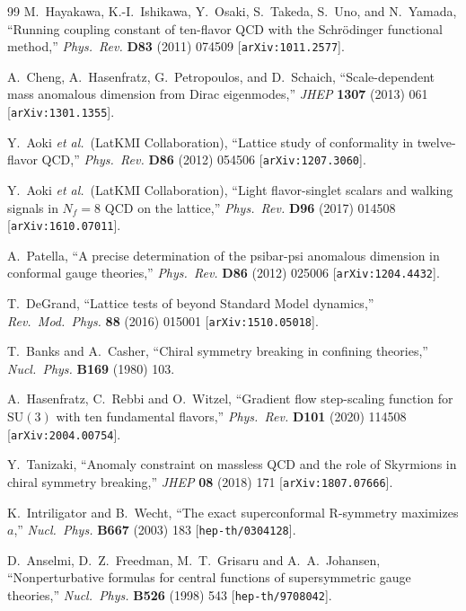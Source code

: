 \documentclass[11pt,a4paper]{article}
\theoremstyle{plain}
\theoremstyle{definition}
\theoremstyle{remark}
\newcommand{\SU}[1]{\mathrm{SU}(#1)}
\begin{document}
\begin{thebibliography}{99}
  M.~Hayakawa, K.-I.~Ishikawa, Y.~Osaki, S.~Takeda, S.~Uno, and
  N.~Yamada,
  ``Running coupling constant of ten-flavor QCD with the
  Schr\"odinger functional method,''
  \textit{Phys.~Rev.} \textbf{D83} (2011) 074509
  [\texttt{arXiv:1011.2577}].

  A.~Cheng, A.~Hasenfratz, G.~Petropoulos, and D.~Schaich,
  ``Scale-dependent mass anomalous dimension from Dirac eigenmodes,''
  \textit{JHEP} \textbf{1307} (2013) 061
  [\texttt{arXiv:1301.1355}].

  Y.~Aoki \textit{et al.}\ (LatKMI Collaboration),
  ``Lattice study of conformality in twelve-flavor QCD,''
  \textit{Phys.~Rev.} \textbf{D86} (2012) 054506
  [\texttt{arXiv:1207.3060}].

  Y.~Aoki \textit{et al.}\ (LatKMI Collaboration),
  ``Light flavor-singlet scalars and walking signals in $N_f=8$ QCD
  on the lattice,''
  \textit{Phys.~Rev.} \textbf{D96} (2017) 014508
  [\texttt{arXiv:1610.07011}].

  A.~Patella,
  ``A precise determination of the psibar-psi anomalous dimension
  in conformal gauge theories,''
  \textit{Phys.~Rev.} \textbf{D86} (2012) 025006
  [\texttt{arXiv:1204.4432}].

  T.~DeGrand,
  ``Lattice tests of beyond Standard Model dynamics,''
  \textit{Rev.~Mod.~Phys.} \textbf{88} (2016) 015001
  [\texttt{arXiv:1510.05018}].

  T.~Banks and A.~Casher, ``Chiral symmetry breaking in confining theories,''
  \textit{Nucl.~Phys.} \textbf{B169} (1980) 103.

  A.~Hasenfratz, C.~Rebbi and O.~Witzel,
  ``Gradient flow step-scaling function for $\SU{3}$ with ten fundamental
  flavors,'' \textit{Phys.~Rev.} \textbf{D101} (2020) 114508
  [\texttt{arXiv:2004.00754}].

  Y.~Tanizaki, ``Anomaly constraint on massless QCD and the role of
  Skyrmions in chiral symmetry breaking,''
  \textit{JHEP} \textbf{08} (2018) 171 [\texttt{arXiv:1807.07666}].

  K.~Intriligator and B.~Wecht, ``The exact superconformal R-symmetry
  maximizes $a$,'' \textit{Nucl.~Phys.} \textbf{B667} (2003) 183
  [\texttt{hep-th/0304128}].

  D.~Anselmi, D.~Z.~Freedman, M.~T.~Grisaru and A.~A.~Johansen,
  ``Nonperturbative formulas for central functions of supersymmetric
  gauge theories,'' \textit{Nucl.~Phys.} \textbf{B526} (1998) 543
  [\texttt{hep-th/9708042}].


\end{thebibliography}
\end{document}
